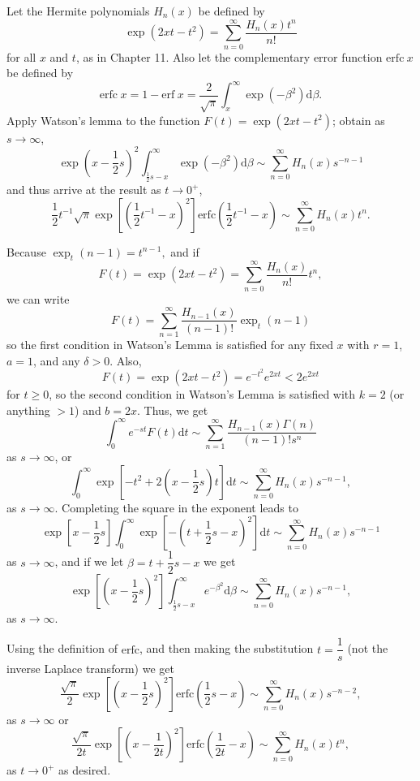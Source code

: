 \begin{problem}\label{problem6chapter3}
Let the Hermite polynomials $H_n(x)$ be defined by 
$$\exp(2xt-t^2) = \displaystyle\sum_{n=0}^{\infty} \dfrac{H_n(x)t^n}{n!}$$
for all $x$ and $t$, as in Chapter 11. Also let the complementary error function $\mathrm{erfc \hspace{3pt}} x$ be defined by
$$\mathrm{erfc \hspace{3pt}}x = 1 - \mathrm{erf \hspace{3pt}}x = \dfrac{2}{\sqrt{\pi}} \displaystyle\int_x^{\infty} \exp(-\beta^2) \mathrm{d}\beta.$$
Apply Watson's lemma to the function $F(t)=\exp(2xt-t^2)$; obtain as $s \rightarrow \infty$,
$$\exp \left( x-\dfrac{1}{2}s \right)^2 \displaystyle\int_{\frac{1}{2}s-x}^{\infty} \exp(-\beta^2) \mathrm{d} \beta \sim \displaystyle\sum_{n=0}^{\infty} H_n(x) s^{-n-1}$$
and thus arrive at the result as $t \rightarrow 0^+$,
$$\dfrac{1}{2} t^{-1} \sqrt{\pi} \exp \left[ \left( \dfrac{1}{2}t^{-1} - x \right)^2 \right] \mathrm{erfc}\left( \dfrac{1}{2}t^{-1} - x \right) \sim \displaystyle\sum_{n=0}^{\infty} H_n(x)t^n.$$
\end{problem}
\begin{solution}
Because $\exp_t(n-1)=t^{n-1},$ and if 
$$F(t) = \exp(2xt-t^2) = \displaystyle\sum_{n=0}^{\infty} \dfrac{H_n(x)}{n!} t^n,$$
we can write
$$F(t) = \displaystyle\sum_{n=1}^{\infty} \dfrac{H_{n-1}(x)}{(n-1)!} \exp_t(n-1)$$
so the first condition in Watson's Lemma is satisfied for any fixed $x$ with $r=1$, $a=1$, and any $\delta > 0$. Also,
$$F(t) = \exp(2xt-t^2) = e^{-t^2} e^{2xt} < 2e^{2xt}$$
for $t \geq 0$, so the second condition in Watson's Lemma is satisfied with $k=2$ (or anything $>1$) and $b=2x$. Thus, we get
$$\displaystyle\int_0^{\infty} e^{-st} F(t) \mathrm{d}t \sim \displaystyle\sum_{n=1}^{\infty} \dfrac{H_{n-1}(x) \Gamma(n)}{(n-1)!s^n}$$
as $s \rightarrow \infty$, or
$$\displaystyle\int_0^{\infty} \exp \left[-t^2+2 \left( x - \dfrac{1}{2}s \right)t \right]\mathrm{d}t \sim \displaystyle\sum_{n=0}^{\infty} H_n(x) s^{-n-1},$$
as $s \rightarrow \infty$. Completing the square in the exponent leads to
$$\exp \left[ x - \dfrac{1}{2}s \right] \displaystyle\int_0^{\infty} \exp \left[ - \left( t+\dfrac{1}{2}s - x \right)^2 \right] \mathrm{d}t \sim \displaystyle\sum_{n=0}^{\infty} H_n(x) s^{-n-1}$$
as $s \rightarrow \infty$, and if we let $\beta = t + \dfrac{1}{2}s - x$ we get
$$\exp \left[ \left( x - \dfrac{1}{2}s \right)^2 \right] \displaystyle\int_{\frac{1}{2}s - x}^{\infty} e^{-\beta^2} \mathrm{d} \beta \sim \displaystyle\sum_{n=0}^{\infty} H_n(x) s^{-n-1},$$
as $s \rightarrow \infty$.

Using the definition of $\mathrm{erfc}$, and then making the substitution $t = \dfrac{1}{s}$ (not the inverse Laplace transform) we get
$$\dfrac{\sqrt{\pi}}{2}\exp \left[ \left(x - \dfrac{1}{2} s \right)^2 \right] \mathrm{erfc} \left( \dfrac{1}{2}s - x \right) \sim \displaystyle\sum_{n=0}^{\infty} H_n(x) s^{-n-2},$$
as $s \rightarrow \infty$ or
$$\dfrac{\sqrt{\pi}}{2t} \exp \left[ \left( x - \dfrac{1}{2t} \right)^2 \right] \mathrm{erfc} \left( \dfrac{1}{2t} - x \right) \sim \displaystyle\sum_{n=0}^{\infty} H_n(x) t^n,$$
as $t \rightarrow 0^+$ as desired.
\end{solution}
